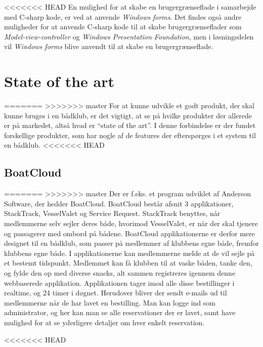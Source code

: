 <<<<<<< HEAD
En mulighed for at skabe en brugergrænseflade i samarbejde med C-sharp kode, er ved at anvende \textit{Windows forms}. 
Det findes også andre muligheder for at anvende C-sharp kode til at skabe brugergrænseflader som \textit{Model-view-controller} og \textit{Windows Presentation Foundation}, men i løsningsdelen vil \textit{Windows forms} blive anvendt til at skabe en brugergrænseflade. 

\section{State of the art}
=======
>>>>>>> master
For at kunne udvikle et godt produkt, der skal kunne bruges i en bådklub, er det vigtigt, at se på hvilke
produkter der allerede er på markedet, altså hvad er ``state of the art''. I denne forbindelse er der fundet
forskellige produkter, som har nogle af de features der efterspørges i et system til en bådklub. 
\newline
<<<<<<< HEAD
\subsection*{BoatCloud}
=======
>>>>>>> master
Der er f.eks.
et program udviklet af Anderson Software, der hedder BoatCloud.\citep{BoatCloud} BoatCloud består afsnit 3
applikationer, StackTrack, VesselValet og Service Request. StackTrack benyttes, når medlemmerne selv sejler
deres både, hvorimod VesselValet, er når der skal tjenere og passagerer med ombord på bådene. 
BoatCloud applikationerne er derfor mere designet til en bådklub, som passer på medlemmer af klubbens egne både, fremfor
klubbens egne både. 
I applikationerne kan medlemmerne melde at de vil sejle på et bestemt tidspunkt. 
Medlemmet kan få klubben til at vaske båden, tanke den, og fylde den op med diverse snacks, alt sammen registreres
igennem denne webbaserede applikation. 
Applikationen tager imod alle disse bestillinger i realtime, og 24 timer i døgnet. 
Herudover bliver der sendt e-mails ud til medlemmerne når de har lavet en bestilling. 
Man kan logge ind som administrator, og her kan man se alle reservationer der er lavet, samt have mulighed for at
se yderligere detaljer om hver enkelt reservation.

<<<<<<< HEAD

